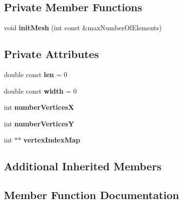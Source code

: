 \subsection*{Private Member Functions}
\begin{DoxyCompactItemize}
\item 
\mbox{\label{classFiniteElementeRect_a29ed0ced33fee536bcc8456e57094865}} 
void {\bfseries init\+Mesh} (int const \&max\+Number\+Of\+Elements)
\end{DoxyCompactItemize}
\subsection*{Private Attributes}
\begin{DoxyCompactItemize}
\item 
\mbox{\label{classFiniteElementeRect_a6beb13ebf0746380af8182e73ea1e929}} 
double const {\bfseries len} = 0
\item 
\mbox{\label{classFiniteElementeRect_a88234e0caad5bdc5864fd210f4293719}} 
double const {\bfseries width} = 0
\item 
\mbox{\label{classFiniteElementeRect_a5bc6d292f48b09aaee773f03f7284f9e}} 
int {\bfseries number\+VerticesX}
\item 
\mbox{\label{classFiniteElementeRect_a0609adb0d65d9aad1a9d566056838be3}} 
int {\bfseries number\+VerticesY}
\item 
\mbox{\label{classFiniteElementeRect_a00313900e5e6bc821ddb74cff3349210}} 
int $\ast$$\ast$ {\bfseries vertex\+Index\+Map}
\end{DoxyCompactItemize}
\subsection*{Additional Inherited Members}


\subsection{Member Function Documentation}
\mbox{\label{classFiniteElementeRect_acbfa1b0263e192b4b7da51a486b623cf}} 

